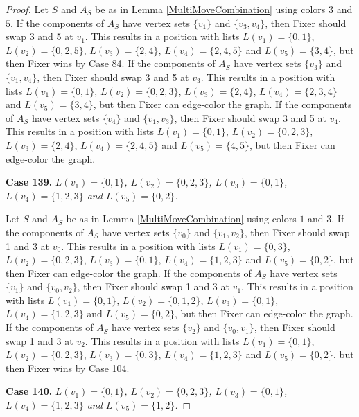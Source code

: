 \documentclass[12pt]{amsart}
\theoremstyle{plain}
\theoremstyle{definition}
\theoremstyle{remark}
\begin{document}
\begin{proof}
Let $S$ and $A_S$ be as in Lemma \ref{MultiMoveCombination} using colors $3$ and $5$. If the components of $A_S$ have vertex sets $\{v_1\}$ and $\{v_3, v_4\}$, then Fixer should swap 3 and 5 at $v_1$. This results in a position with lists $L(v_1) = \{0, 1\}$, $L(v_2) = \{0, 2, 5\}$, $L(v_3) = \{2, 4\}$, $L(v_4) = \{2, 4, 5\}$ and $L(v_5) = \{3, 4\}$, but then Fixer wins by Case 84.
If the components of $A_S$ have vertex sets $\{v_3\}$ and $\{v_1, v_4\}$, then Fixer should swap 3 and 5 at $v_3$. This results in a position with lists $L(v_1) = \{0, 1\}$, $L(v_2) = \{0, 2, 3\}$, $L(v_3) = \{2, 4\}$, $L(v_4) = \{2, 3, 4\}$ and $L(v_5) = \{3, 4\}$, but then Fixer can edge-color the graph.
If the components of $A_S$ have vertex sets $\{v_4\}$ and $\{v_1, v_3\}$, then Fixer should swap 3 and 5 at $v_4$. This results in a position with lists $L(v_1) = \{0, 1\}$, $L(v_2) = \{0, 2, 3\}$, $L(v_3) = \{2, 4\}$, $L(v_4) = \{2, 4, 5\}$ and $L(v_5) = \{4, 5\}$, but then Fixer can edge-color the graph.

\noindent\textbf{Case 139.  }\textit{$L(v_1) = \{0, 1\}$, $L(v_2) = \{0, 2, 3\}$, $L(v_3) = \{0, 1\}$, $L(v_4) = \{1, 2, 3\}$ and $L(v_5) = \{0, 2\}$.}

Let $S$ and $A_S$ be as in Lemma \ref{MultiMoveCombination} using colors $1$ and $3$. If the components of $A_S$ have vertex sets $\{v_0\}$ and $\{v_1, v_2\}$, then Fixer should swap 1 and 3 at $v_0$. This results in a position with lists $L(v_1) = \{0, 3\}$, $L(v_2) = \{0, 2, 3\}$, $L(v_3) = \{0, 1\}$, $L(v_4) = \{1, 2, 3\}$ and $L(v_5) = \{0, 2\}$, but then Fixer can edge-color the graph.
If the components of $A_S$ have vertex sets $\{v_1\}$ and $\{v_0, v_2\}$, then Fixer should swap 1 and 3 at $v_1$. This results in a position with lists $L(v_1) = \{0, 1\}$, $L(v_2) = \{0, 1, 2\}$, $L(v_3) = \{0, 1\}$, $L(v_4) = \{1, 2, 3\}$ and $L(v_5) = \{0, 2\}$, but then Fixer can edge-color the graph.
If the components of $A_S$ have vertex sets $\{v_2\}$ and $\{v_0, v_1\}$, then Fixer should swap 1 and 3 at $v_2$. This results in a position with lists $L(v_1) = \{0, 1\}$, $L(v_2) = \{0, 2, 3\}$, $L(v_3) = \{0, 3\}$, $L(v_4) = \{1, 2, 3\}$ and $L(v_5) = \{0, 2\}$, but then Fixer wins by Case 104.

\noindent\textbf{Case 140.  }\textit{$L(v_1) = \{0, 1\}$, $L(v_2) = \{0, 2, 3\}$, $L(v_3) = \{0, 1\}$, $L(v_4) = \{1, 2, 3\}$ and $L(v_5) = \{1, 2\}$.}


\end{proof}
\end{document}
